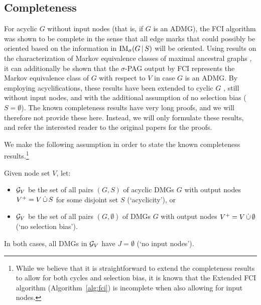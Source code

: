 \subsection{Completeness}

For acyclic $G$ without input nodes (that is, if $G$ is an ADMG), the FCI algorithm was shown to be complete \cite{Zhang2008_AI} in the sense that all edge marks that could possibly be oriented based on the information in $\mathrm{IM}_\sigma(G \operatorname*{|} S)$ will be oriented.
Using results on the characterization of Markov equivalence classes of maximal ancestral graphs \cite{Ali++2005}, it can additionally be shown that the $\sigma$-PAG output by FCI represents the Markov equivalence class of $G$ with respect to $V$ in case $G$ is an ADMG.
By employing acyclifications, these results have been extended to cyclic $G$ \cite{MooijClaassen_UAI_20}, still without input nodes, and with the additional assumption of no selection bias ($S = \emptyset$).
The known completeness results have very long proofs, and we will therefore not provide these here.
Instead, we will only formulate these results, and refer the interested reader to the original papers for the proofs.


We make the following assumption in order to state the known completeness results.\footnote{While we believe that it is straightforward to extend the completeness results to allow for both cycles and selection bias, it is known that the Extended FCI algorithm (Algorithm~\ref{alg:fci}) is incomplete when also allowing for input nodes.}
\begin{Ass}\label{ass:fci_completeness_assumption}
  Given node set $V$, let:
  \begin{itemize}
    \item $\mathcal{G}_V$ be the set of all pairs $(G,S)$ of acyclic DMGs $G$ with output nodes $V^+ = V \,\dot{\cup}\, S$ for some disjoint set $S$ (`acyclicity'), or
    \item $\mathcal{G}_V$ be the set of all pairs $(G,\emptyset)$ of DMGs $G$ with output nodes $V^+ = V \,\dot{\cup}\, \emptyset$ (`no selection bias').
  \end{itemize}
  In both cases, all DMGs in $\mathcal{G}_V$ have $J = \emptyset$ (`no input nodes').
\end{Ass}

